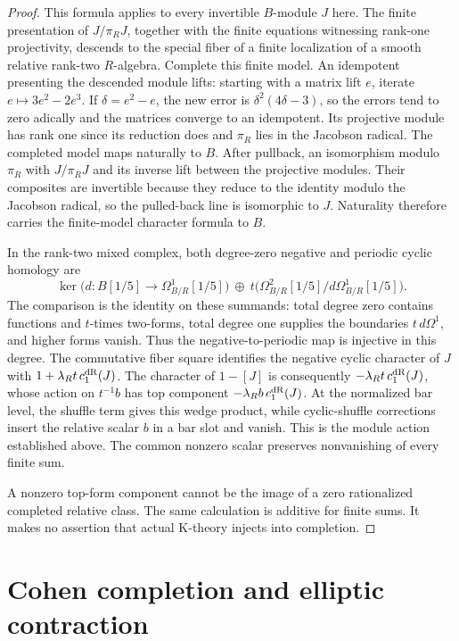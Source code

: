 \begin{proof}
This formula applies to every invertible \(B\)-module \(J\) here.
The finite presentation of \(J/\pi_RJ\), together with the finite
equations witnessing rank-one projectivity, descends to the
special fiber of a finite localization of a smooth relative
rank-two \(R\)-algebra. Complete this finite model.
An idempotent presenting the descended module lifts: starting
with a matrix lift \(e\), iterate \(e\mapsto3e^2-2e^3\).
If \(\delta=e^2-e\), the new error is
\(\delta^2(4\delta-3)\), so the errors tend to zero adically
and the matrices converge to an idempotent.
Its projective module has rank one since its reduction does
and \(\pi_R\) lies in the Jacobson radical.
The completed model maps naturally to \(B\).
After pullback, an isomorphism modulo \(\pi_R\) with \(J/\pi_RJ\)
and its inverse lift between the projective modules.
Their composites are invertible because they reduce to the
identity modulo the Jacobson radical, so the pulled-back line
is isomorphic to \(J\).
Naturality therefore carries the finite-model character formula
to \(B\).

In the rank-two mixed complex, both degree-zero negative and
periodic cyclic homology are
\[
 \ker\bigl(d\colon B[1/5]\longrightarrow
                    \Omega^1_{B/R}[1/5]\bigr)
 \ \oplus\
 t\bigl(\Omega^2_{B/R}[1/5]/d\Omega^1_{B/R}[1/5]\bigr).
\]
The comparison is the identity on these summands: total degree
zero contains functions and \(t\)-times two-forms, total degree
one supplies the boundaries \(t\,d\Omega^1\), and higher forms
vanish. Thus the negative-to-periodic map is injective in this
degree. The commutative fiber square identifies the negative
cyclic character of \(J\) with
\(1+\lambda_Rt\,c_1^{\mathrm{dR}}(J)\).
The character of \(1-[J]\) is consequently
\(-\lambda_Rt\,c_1^{\mathrm{dR}}(J)\), whose action on \(t^{-1}b\)
has top component \(-\lambda_Rb\,c_1^{\mathrm{dR}}(J)\).
At the normalized bar level, the shuffle term gives this wedge
product, while cyclic-shuffle corrections insert the relative
scalar \(b\) in a bar slot and vanish.
This is the module action established above.
The common nonzero scalar preserves nonvanishing of every
finite sum.

A nonzero top-form component cannot be the image of a zero
rationalized completed relative class.
The same calculation is additive for finite sums.
It makes no assertion that actual K-theory injects into completion.
\end{proof}

\section{Cohen completion and elliptic contraction}\label{d2:sec:cohen}

